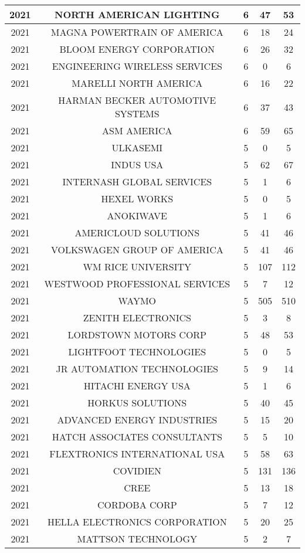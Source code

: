 \documentclass{article}%
\begin{document}
\begin{longtable}{c|c|c|c|c}
\hline%
2021&NORTH AMERICAN LIGHTING&6&47&53\\%
\hline%
2021&MAGNA POWERTRAIN OF AMERICA&6&18&24\\%
\hline%
2021&BLOOM ENERGY CORPORATION&6&26&32\\%
\hline%
2021&ENGINEERING WIRELESS SERVICES&6&0&6\\%
\hline%
2021&MARELLI NORTH AMERICA&6&16&22\\%
\hline%
2021&HARMAN BECKER AUTOMOTIVE SYSTEMS&6&37&43\\%
\hline%
2021&ASM AMERICA&6&59&65\\%
\hline%
2021&ULKASEMI&5&0&5\\%
\hline%
2021&INDUS USA&5&62&67\\%
\hline%
2021&INTERNASH GLOBAL SERVICES&5&1&6\\%
\hline%
2021&HEXEL WORKS&5&0&5\\%
\hline%
2021&ANOKIWAVE&5&1&6\\%
\hline%
2021&AMERICLOUD SOLUTIONS&5&41&46\\%
\hline%
2021&VOLKSWAGEN GROUP OF AMERICA&5&41&46\\%
\hline%
2021&WM RICE UNIVERSITY&5&107&112\\%
\hline%
2021&WESTWOOD PROFESSIONAL SERVICES&5&7&12\\%
\hline%
2021&WAYMO&5&505&510\\%
\hline%
2021&ZENITH ELECTRONICS&5&3&8\\%
\hline%
2021&LORDSTOWN MOTORS CORP&5&48&53\\%
\hline%
2021&LIGHTFOOT TECHNOLOGIES&5&0&5\\%
\hline%
2021&JR AUTOMATION TECHNOLOGIES&5&9&14\\%
\hline%
2021&HITACHI ENERGY USA&5&1&6\\%
\hline%
2021&HORKUS SOLUTIONS&5&40&45\\%
\hline%
2021&ADVANCED ENERGY INDUSTRIES&5&15&20\\%
\hline%
2021&HATCH ASSOCIATES CONSULTANTS&5&5&10\\%
\hline%
2021&FLEXTRONICS INTERNATIONAL USA&5&58&63\\%
\hline%
2021&COVIDIEN&5&131&136\\%
\hline%
2021&CREE&5&13&18\\%
\hline%
2021&CORDOBA CORP&5&7&12\\%
\hline%
2021&HELLA ELECTRONICS CORPORATION&5&20&25\\%
\hline%
2021&MATTSON TECHNOLOGY&5&2&7\\%

\end{longtable}
\end{document}
